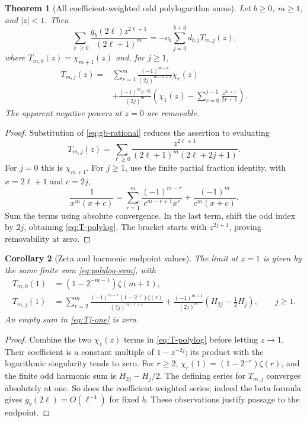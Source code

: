 \documentclass[11pt]{article}
\numberwithin{equation}{section}
\newtheorem{theorem}{Theorem}[section]
\newtheorem{corollary}[theorem]{Corollary}
\theoremstyle{definition}\newtheorem{definition}[theorem]{Definition}
\theoremstyle{remark}\newtheorem{remark}[theorem]{Remark}
\begin{document}
\begin{theorem}[All coefficient-weighted odd polylogarithm sums]
\label{thm:polylog-sum}
Let $b\ge0$, $m\ge1$, and $|z|<1$. Then
\begin{equation}\label{eq:polylog-sum}
 \sum_{\ell\ge0}\frac{g_b(2\ell)z^{2\ell+1}}{(2\ell+1)^m}
 =-c_b\sum_{j=0}^{b+3}d_{b,j}T_{m,j}(z),
\end{equation}
where $T_{m,0}(z)=\chi_{m+1}(z)$ and, for $j\ge1$,
\begin{equation}\label{eq:T-polylog}
\begin{split}
 T_{m,j}(z)={}&\sum_{r=1}^m
 \frac{(-1)^{m-r}}{(2j)^{m-r+1}}\chi_r(z)\\
 &+\frac{(-1)^m z^{-2j}}{(2j)^m}
 \left(\chi_1(z)-\sum_{r=0}^{j-1}\frac{z^{2r+1}}{2r+1}\right).
\end{split}
\end{equation}
The apparent negative powers at $z=0$ are removable.
\end{theorem}
\begin{proof}
Substitution of \eqref{eq:gb-rational} reduces the assertion to evaluating
\[
 T_{m,j}(z)=\sum_{\ell\ge0}
 \frac{z^{2\ell+1}}{(2\ell+1)^m(2\ell+2j+1)}.
\]
For $j=0$ this is $\chi_{m+1}$. For $j\ge1$, use the finite partial
fraction identity, with $x=2\ell+1$ and $c=2j$,
\begin{equation}\label{eq:partial-fraction}
 \frac1{x^m(x+c)}=
 \sum_{r=1}^m\frac{(-1)^{m-r}}{c^{m-r+1}x^r}
 +\frac{(-1)^m}{c^m(x+c)}.
\end{equation}
Sum the terms using absolute convergence. In the last term, shift the
odd index by $2j$, obtaining \eqref{eq:T-polylog}. The bracket starts
with $z^{2j+1}$, proving removability at zero.
\end{proof}

\begin{corollary}[Zeta and harmonic endpoint values]\label{cor:polylog-endpoint}
The limit at $z=1$ is given by the same finite sum
\eqref{eq:polylog-sum}, with
\begin{align}
 T_{m,0}(1)&=(1-2^{-m-1})\zeta(m+1),\label{eq:T0-one}\\
 T_{m,j}(1)&=\sum_{r=2}^m
 \frac{(-1)^{m-r}(1-2^{-r})\zeta(r)}{(2j)^{m-r+1}}
 +\frac{(-1)^{m+1}}{(2j)^m}
       \left(H_{2j}-\frac12H_j\right),\qquad j\ge1.
 \label{eq:Tj-one}
\end{align}
An empty sum in \eqref{eq:Tj-one} is zero.
\end{corollary}
\begin{proof}
Combine the two $\chi_1(z)$ terms in \eqref{eq:T-polylog} before
letting $z\to1$. Their coefficient is a constant multiple of
$1-z^{-2j}$; its product with the logarithmic singularity tends to zero.
For $r\ge2$, $\chi_r(1)=(1-2^{-r})\zeta(r)$, and the finite odd
harmonic sum is $H_{2j}-H_j/2$. The defining series for $T_{m,j}$
converges absolutely at one. So does the coefficient-weighted series;
indeed the beta formula gives $g_b(2\ell)=O(\ell^{-4})$ for fixed $b$.
These observations justify passage to the endpoint.
\end{proof}
\end{document}
